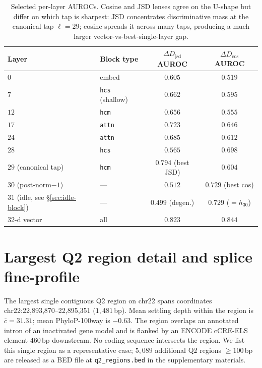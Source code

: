 \documentclass{article}
\theoremstyle{plain}
\theoremstyle{definition}
\theoremstyle{remark}
\newcommand{\DDcos}{\Delta D_{\cos}}
\newcommand{\DDjsd}{\Delta D_{\mathrm{jsd}}}
\begin{document}
\begin{table}[h]
\caption{Selected per-layer AUROCs. Cosine and JSD lenses agree on the
U-shape but differ on which tap is sharpest: JSD concentrates
discriminative mass at the canonical tap $\ell=29$; cosine spreads it
across many taps, producing a much larger vector-vs-best-single-layer
gap.}
\label{tab:per-layer}
\centering
\small
\begin{tabular}{@{}llcc@{}}
\toprule
Layer & Block type & $\DDjsd$ AUROC & $\DDcos$ AUROC \\
\midrule
$0$  & embed                    & $0.605$ & $0.519$ \\
$7$  & \texttt{hcs} (shallow)   & $0.662$ & $0.595$ \\
$12$ & \texttt{hcm}             & $0.656$ & $0.555$ \\
$17$ & \texttt{attn}            & $0.723$ & $0.646$ \\
$24$ & \texttt{attn}            & $0.685$ & $0.612$ \\
$28$ & \texttt{hcs}             & $0.565$ & $0.698$ \\
$29$ (canonical tap) & \texttt{hcm}
                                & $\mathbf{0.794}$ (best JSD) & $0.604$ \\
$30$ (post-norm$-1$)  & ---     & $0.512$ & $\mathbf{0.729}$ (best cos) \\
$31$ (idle, see \S\ref{sec:idle-block}) & ---
                                & $0.499$ (degen.) & $0.729$ ($=h_{30}$) \\
\midrule
32-d vector & all                 & $0.823$ & $0.844$ \\
\bottomrule
\end{tabular}
\end{table}

\section{Largest Q2 region detail and splice fine-profile}
\label{app:q2-splice-profile}

The largest single contiguous Q2 region on chr22 spans coordinates
chr22:22{,}893{,}870--22{,}895{,}351 ($1{,}481$\,bp). Mean settling
depth within the region is $\bar c = 31.31$; mean PhyloP-100way is
$-0.63$. The region overlaps an annotated intron of an inactivated gene
model and is flanked by an ENCODE cCRE-ELS element $460$\,bp
downstream. No coding sequence intersects the region. We list this
single region as a representative case; $5{,}089$ additional Q2 regions
$\ge 100$\,bp are released as a BED file at \texttt{q2\_regions.bed} in
the supplementary materials.
\end{document}
